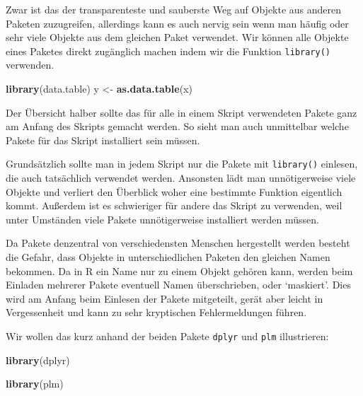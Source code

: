 \documentclass[]{tufte-book}
\newenvironment{Shaded}{}{}
\newcommand{\KeywordTok}[1]{\textcolor[rgb]{0.00,0.44,0.13}{\textbf{#1}}}
\newcommand{\StringTok}[1]{\textcolor[rgb]{0.25,0.44,0.63}{#1}}
\newcommand{\NormalTok}[1]{#1}
\begin{document}
Zwar ist das der transparenteste und sauberste Weg auf Objekte aus
anderen Paketen zuzugreifen, allerdings kann es auch nervig sein wenn
man häufig oder sehr viele Objekte aus dem gleichen Paket verwendet. Wir
können alle Objekte eines Paketes direkt zugänglich machen indem wir die
Funktion \texttt{library()} verwenden.

\begin{Shaded}
\begin{Highlighting}[]
\KeywordTok{library}\NormalTok{(data.table)}
\NormalTok{y <-}\StringTok{ }\KeywordTok{as.data.table}\NormalTok{(x)}
\end{Highlighting}
\end{Shaded}

Der Übersicht halber sollte das für alle in einem Skript verwendeten
Pakete ganz am Anfang des Skripts gemacht werden. So sieht man auch
unmittelbar welche Pakete für das Skript installiert sein müssen.

Grundsätzlich sollte man in jedem Skript nur die Pakete mit
\texttt{library()} einlesen, die auch tatsächlich verwendet werden.
Ansonsten lädt man unnötigerweise viele Objekte und verliert den
Überblick woher eine bestimmte Funktion eigentlich kommt. Außerdem ist
es schwieriger für andere das Skript zu verwenden, weil unter Umständen
viele Pakete unnötigerweise installiert werden müssen.

Da Pakete denzentral von verschiedensten Menschen hergestellt werden
besteht die Gefahr, dass Objekte in unterschiedlichen Paketen den
gleichen Namen bekommen. Da in R ein Name nur zu einem Objekt gehören
kann, werden beim Einladen mehrerer Pakete eventuell Namen
überschrieben, oder `maskiert'. Dies wird am Anfang beim Einlesen der
Pakete mitgeteilt, gerät aber leicht in Vergessenheit und kann zu sehr
kryptischen Fehlermeldungen führen.

Wir wollen das kurz anhand der beiden Pakete \texttt{dplyr} und
\texttt{plm} illustrieren:

\begin{Shaded}
\begin{Highlighting}[]
\KeywordTok{library}\NormalTok{(dplyr)}
\end{Highlighting}
\end{Shaded}

\begin{Shaded}
\begin{Highlighting}[]
\KeywordTok{library}\NormalTok{(plm)}
\end{Highlighting}
\end{Shaded}
\end{document}
